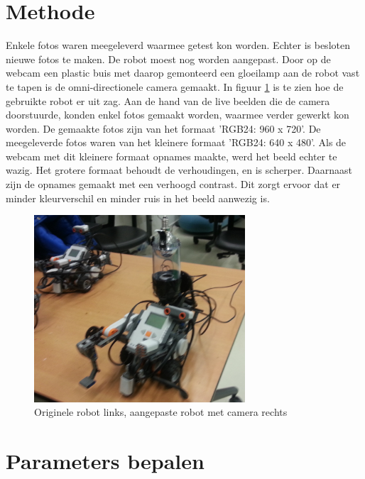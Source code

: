 \documentclass[a4paper]{article}
\begin{document}
\section{Methode}
Enkele fotos waren meegeleverd waarmee getest kon worden. Echter is besloten nieuwe fotos te maken. De robot moest nog worden aangepast. Door op de webcam een plastic buis met daarop gemonteerd een gloeilamp aan de robot vast te tapen is de omni-directionele camera gemaakt. In figuur \ref{fig:opstelling} is te zien hoe de gebruikte robot er uit zag. Aan de hand van de live beelden die de camera doorstuurde, konden enkel fotos gemaakt worden, waarmee verder gewerkt kon worden. De gemaakte fotos zijn van het formaat 'RGB24: 960 x 720'. De meegeleverde fotos waren van het kleinere formaat 'RGB24: 640 x 480'. Als de webcam met dit kleinere formaat opnames maakte, werd het beeld echter te wazig. Het grotere formaat behoudt de verhoudingen, en is scherper. Daarnaast zijn de opnames gemaakt met een verhoogd contrast. Dit zorgt ervoor dat er minder kleurverschil en minder ruis in het beeld aanwezig is.
\begin{figure}[h]
	\centering
	\includegraphics[width=0.7\textwidth]{img/opstelling.jpg}
	\caption{Originele robot links, aangepaste robot met camera rechts}
	\label{fig:opstelling}
\end{figure}
\section{Parameters bepalen}
\end{document}
